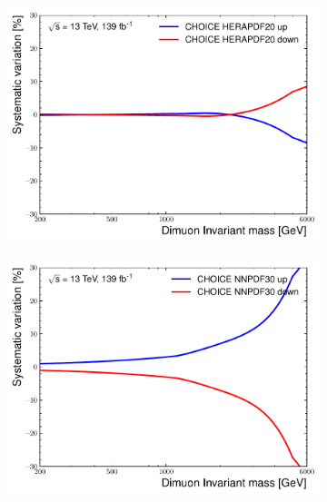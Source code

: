 \begin{figure}[h!]
    \centering
    \begin{subfigure}[b]{0.42\textwidth}
        \centering
        \includegraphics[width=\textwidth]{figures/analysis/datamc/Uncertainties/theory/mm/backgroundTemplate_KF_CHOICE_HERAPDF20.pdf}
        \caption{}
        \label{fig:uncert:mmchoiceHERA}
    \end{subfigure}
    \begin{subfigure}[b]{0.42\textwidth}
        \centering
        \includegraphics[width=\textwidth]{figures/analysis/datamc/Uncertainties/theory/mm/backgroundTemplate_KF_CHOICE_NNPDF30.pdf}
        \caption{}
        \label{fig:uncert:mmchoiceNNPDF}
    \end{subfigure}

\end{figure}
